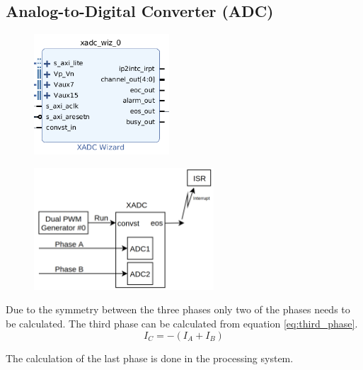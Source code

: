 \subsection{Analog-to-Digital Converter (ADC)}


\begin{figure}[H]
	\centering
	\includegraphics[width=0.45\textwidth]{pictures/software/adc.png}
	\caption{}
	\label{fig:adc_module}
\end{figure}



\begin{figure}[H]
	\centering
	\includegraphics[width=0.6\textwidth]{pictures/software/adc_block_diagram.png}
	\caption{}
	\label{fig:adc_block_diagram}
\end{figure}


 Due to the symmetry between the three phases only two of the phases needs to be calculated. The third phase can be calculated from equation \ref{eq:third_phase}.
\begin{equation}
    I_C = -(I_A + I_B)
    \label{eq:third_phase}
\end{equation}

The calculation of the last phase is done in the processing system.
